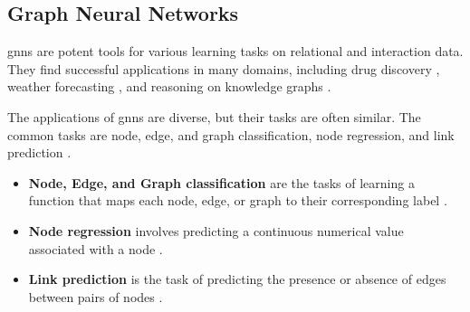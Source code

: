

\subsection{Graph Neural Networks}
\label{s_Background_GNNs}



\glspl{gnn} are potent tools for various learning tasks on relational and interaction data. They find successful applications in many domains, including drug discovery \cite{dauparas_robust_2022}, weather forecasting \cite{lam_graphcast_2022}, and reasoning on knowledge graphs \cite{huang_few-shot_2022}. 

\newpage

The applications of \glspl{gnn} are diverse, but their tasks are often similar. The common tasks are node, edge, and graph classification, node regression, and link prediction \cite{wu_comprehensive_2021, zhou_graph_2020}.
\begin{itemize}
    \item \textbf{Node, Edge, and Graph classification} are the tasks of learning a function that maps each node, edge, or graph to their corresponding label \cite{kipf_semi-supervised_2017}.
    \item \textbf{Node regression} involves predicting a continuous numerical value associated with a node \cite{wu_comprehensive_2021}.
    \item \textbf{Link prediction} is the task of predicting the presence or absence of edges between pairs of nodes \cite{liben-nowell_link-prediction_2007}.
\end{itemize}

